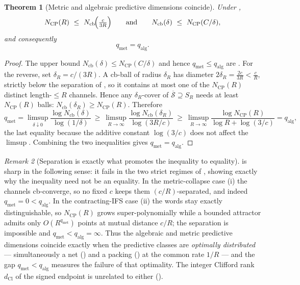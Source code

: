 \documentclass[11pt]{article}
\newtheorem{theorem}{Theorem}[section]
\theoremstyle{definition}
\theoremstyle{remark}
\newtheorem{remark}[theorem]{Remark}
\newcommand{\CP}{\mathrm{CP}}
\newcommand{\qalg}{q_{\mathrm{alg}}}
\newcommand{\qmet}{q_{\mathrm{met}}}
\newcommand{\dCl}{d_{\mathrm{Cl}}}
\newcommand{\cb}{\mathrm{cb}}
\begin{document}
\begin{theorem}[Metric and algebraic predictive dimensions coincide]
\label{thm:qmet-qalg-equality}
Under ,
\[
  N_{\CP}(R)\ \le\ N_{\cb}\!\Bigl(\tfrac{c}{3R}\Bigr)
  \qquad\text{and}\qquad
  N_{\cb}(\delta)\ \le\ N_{\CP}(C/\delta),
\]
and consequently
\[
  \boxed{\ \qmet=\qalg.\ }
\]
\end{theorem}

\begin{proof}
The upper bound $N_{\cb}(\delta)\le N_{\CP}(C/\delta)$ and hence
$\qmet\le\qalg$ are .  For the reverse, set
$\delta_R=c/(3R)$.  A $\cb$-ball of radius $\delta_R$ has diameter
$2\delta_R=\tfrac{2c}{3R}<\tfrac{c}{R}$, strictly below the separation of
, so it contains at most one of the
$N_{\CP}(R)$ distinct length-$\le R$ channels.  Hence any $\delta_R$-cover of
$\overline{\mathcal S}\supseteq S_R$ needs at least $N_{\CP}(R)$ balls:
$N_{\cb}(\delta_R)\ge N_{\CP}(R)$.  Therefore
\[
  \qmet=\limsup_{\delta\downarrow0}\frac{\log N_{\cb}(\delta)}{\log(1/\delta)}
  \ \ge\ \limsup_{R\to\infty}\frac{\log N_{\cb}(\delta_R)}{\log(3R/c)}
  \ \ge\ \limsup_{R\to\infty}\frac{\log N_{\CP}(R)}{\log R+\log(3/c)}
  =\qalg,
\]
the last equality because the additive constant $\log(3/c)$ does not affect the
$\limsup$.  Combining the two inequalities gives $\qmet=\qalg$.
\end{proof}

\begin{remark}[Separation is exactly what promotes the inequality to equality]
\label{rem:equality-sharp}
 is sharp in the following sense: it fails in the
two strict regimes of , showing exactly why the inequality
need not be an equality.  In the metric-collapse case (i) the channels
cb-converge, so no fixed $c$ keeps them $(c/R)$-separated, and indeed $\qmet=0<
\qalg$.  In the contracting-IFS case (ii) the words stay exactly distinguishable,
so $N_{\CP}(R)$ grows super-polynomially while a bounded attractor admits only
$O(R^{\qmet})$ points at mutual distance $c/R$; the separation is impossible and
$\qmet<\qalg=\infty$.  Thus the algebraic and metric predictive dimensions
coincide exactly when the predictive classes are \emph{optimally distributed} ---
simultaneously a net () and a packing
() at the common rate $1/R$ --- and the gap
$\qmet<\qalg$ measures the failure of that optimality.  The integer Clifford rank
$\dCl$ of the signed endpoint is unrelated to either
\textup{(}\textup{)}.
\end{remark}
\end{document}
